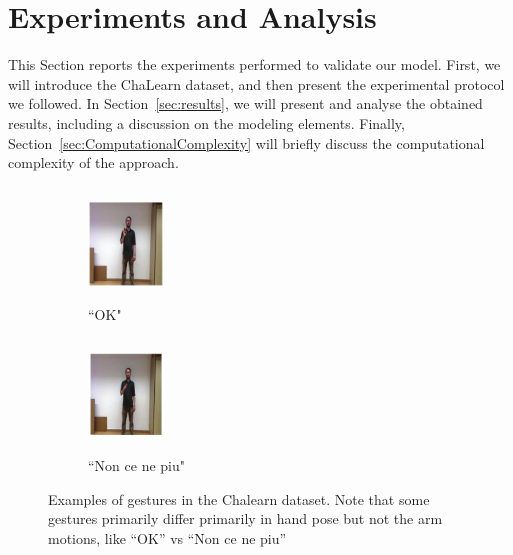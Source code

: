 

\section{Experiments and Analysis}

This Section reports the experiments performed to validate our model.
First, we will introduce the ChaLearn dataset, and then present the experimental protocol we followed.
In Section~\ref{sec:results}, we will present and analyse the obtained results, including a discussion 
on the modeling elements.
Finally, Section~\ref{sec:ComputationalComplexity} will briefly discuss the computational complexity of the approach.




\begin{figure}[t]
        \centering
        \begin{subfigure}[c]{.2\textwidth}
        \centering
                \includegraphics[width=2cm,height=3cm, trim=120 100 100 50, clip]{images/ok}
                \caption{``OK"}
        \end{subfigure}%
        \begin{subfigure}[c]{0.2\textwidth}
        \centering
                \includegraphics[width=2cm,height=3cm, trim=120 100 100 50, clip]{images/noncenepiu}
                \caption{``Non ce ne piu"}
        \end{subfigure}
  \caption{
Examples of gestures in the Chalearn dataset. 
Note that some gestures primarily differ primarily in hand pose but not the arm motions, like ``OK'' vs ``Non ce ne piu''
  }
\label{fig:chalearnclasses}
\end{figure}


